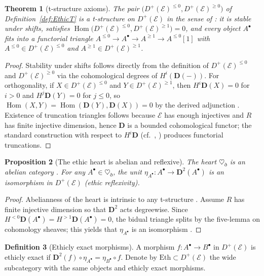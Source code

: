 \documentclass[12pt]{article}
\newcommand{\E}{\mathcal{E}}
\newcommand{\Hom}{\operatorname{Hom}}
\newcommand{\Dplus}{D^{+}}
\theoremstyle{plain}
\newtheorem{theorem}{Theorem}[section]
\newtheorem{proposition}[theorem]{Proposition}
\theoremstyle{definition}
\newtheorem{definition}[theorem]{Definition}
\theoremstyle{remark}
\numberwithin{equation}{section}
\begin{document}
\begin{theorem}[t-structure axioms]\label{thm:t-axioms}
The pair \(\big(\Dplus(\E)^{\le0},\Dplus(\E)^{\ge0}\big)\) of Definition~\ref{def:EthicT} is a t-structure on \(\Dplus(\E)\) in the sense of \cite{BBD1982}: it is stable under shifts, satisfies \(\Hom\big(\Dplus(\E)^{\le0},\Dplus(\E)^{\ge1}\big)=0\), and every object \(A^\bullet\) fits into a functorial triangle \(A^{\le0}\to A^\bullet\to A^{\ge1}\to A^{\le0}[1]\) with \(A^{\le0}\in \Dplus(\E)^{\le0}\) and \(A^{\ge1}\in \Dplus(\E)^{\ge1}\).
\end{theorem}

\begin{proof}
Stability under shifts follows directly from the definition of
$\Dplus(\E)^{\le0}$ and $\Dplus(\E)^{\ge0}$ via the cohomological degrees
of $H^i(\mathbf D(-))$.  
For orthogonality, if $X\in\Dplus(\E)^{\le0}$ and $Y\in\Dplus(\E)^{\ge1}$,
then $H^i\mathbf D(X)=0$ for $i>0$ and $H^j\mathbf D(Y)=0$ for $j\le0$,
so $\Hom(X,Y)=\Hom(\mathbf D(Y),\mathbf D(X))=0$
by the derived adjunction
\cite{GelfandManin2003}.  
Existence of truncation triangles follows because $\E$ has enough
injectives and $R$ has finite injective dimension,
hence $\mathbf D$ is a bounded cohomological functor;
the standard construction with respect to $H^i\mathbf D$
(cf.\ \cite{BBD1982}, \cite{Neeman2001})
produces functorial truncations.
\end{proof}

\begin{proposition}[The ethic heart is abelian and reflexive]\label{prop:heart-abelian}
The heart \(\heartsuit_{\eth}\) is an abelian category \cite{BBD1982}. For any \(A^\bullet\in \heartsuit_{\eth}\), the unit \(\eta_{A^\bullet}:A^\bullet\to \mathbf D^2(A^\bullet)\) is an isomorphism in \(\Dplus(\E)\) (ethic reflexivity).
\end{proposition}

\begin{proof}
Abelianness of the heart is intrinsic to any t-structure \cite{BBD1982}. Assume $R$ has finite injective dimension so that
$\mathbf D^2$ acts degreewise.
Since $H^{<0}\mathbf D(A^\bullet)=H^{>1}\mathbf D(A^\bullet)=0$,
the bidual triangle splits by the five-lemma on cohomology sheaves; this yields that \(\eta_{A^\bullet}\) is an isomorphism \cite{GelfandManin2003}.
\end{proof}

\begin{definition}[Ethicly exact morphisms]\label{def:eth-maps}
A morphism \(f:A^\bullet\to B^\bullet\) in \(\Dplus(\E)\) is ethicly exact if \(\mathbf D^2(f)\circ \eta_{A^\bullet}=\eta_{B^\bullet}\circ f\). Denote by \(\mathrm{Eth}\subset \Dplus(\E)\) the wide subcategory with the same objects and ethicly exact morphisms.
\end{definition}
\end{document}
